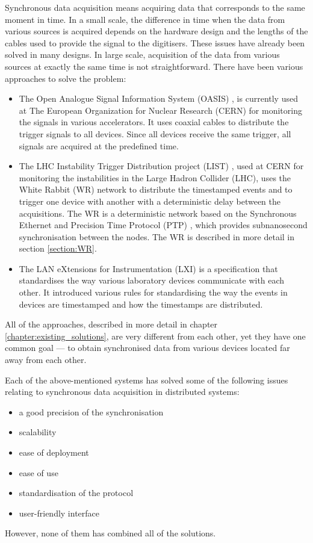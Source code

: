     Synchronous data acquisition means acquiring data that corresponds to the same moment in time. In a small scale, the difference in time when the data from various sources is acquired depends on the hardware design and the lengths of the cables used to provide the signal to the digitisers. These issues have already been solved in many designs. In large scale, acquisition of the data from various sources at exactly the same time is not straightforward.
    There have been various approaches to solve the problem: 
    \begin{itemize}
        \item The Open Analogue Signal Information System (OASIS) \cite{OASIS}, is currently used at The European Organization for Nuclear Research (CERN) for monitoring the signals in various accelerators. It uses coaxial cables to distribute the trigger signals to all devices. Since all devices receive the same trigger, all signals are acquired at the predefined time.
        \item The LHC Instability Trigger Distribution project (LIST) \cite{LIST_instability_diagnostics}, used at CERN for monitoring the instabilities in the Large Hadron Collider (LHC), uses the White Rabbit (WR) \cite{wr_master} network to distribute the timestamped events and to trigger one device with another with a deterministic delay between the acquisitions. The WR is a deterministic network based on the Synchronous Ethernet and Precision Time Protocol (PTP) \cite{ptp}, which provides subnanosecond synchronisation between the nodes\cite{wr_master}. The WR is described in more detail in section \ref{section:WR}.
        \item The LAN eXtensions for Instrumentation (LXI) \cite{specification:LXI} is a specification that standardises the way various laboratory devices communicate with each other. It introduced various rules for standardising the way the events in devices are timestamped and how the timestamps are distributed.
    \end{itemize}
    All of the approaches, described in more detail in chapter \ref{chapter:existing_solutions}, are very different from each other, yet they have one common goal --- to obtain synchronised data from various devices located far away from each other. 
    
    Each of the above-mentioned systems has solved some of the following issues relating to synchronous data acquisition in distributed systems:
    \begin{itemize}
        \item a good precision of the synchronisation
        \item scalability
        \item ease of deployment
        \item ease of use
        \item standardisation of the protocol
        \item user-friendly interface
    \end{itemize}
    However, none of them has combined all of the solutions.

